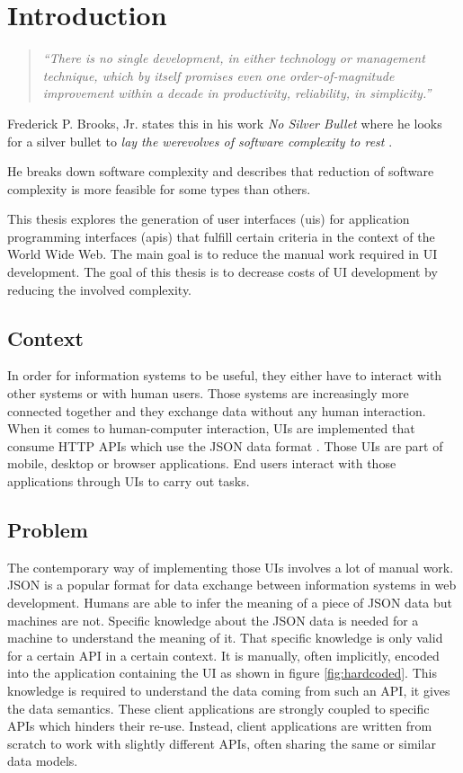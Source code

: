 \section{Introduction}\label{introduction}

\begin{quotation}
\textit{``There is no single development, in either technology or management technique, which by itself promises even one order-of-magnitude improvement within a decade in productivity, reliability, in simplicity.''} \citep[p.~1]{nosilverbullet}
\end{quotation}

Frederick P. Brooks, Jr. states this in his work \textit{No Silver Bullet} where he looks for a silver bullet to \textit{lay the werevolves of software complexity to rest} \citep[p.~1]{nosilverbullet}.

He breaks down software complexity and describes that reduction of software complexity is more feasible for some types than others.

This thesis explores the generation of user interfaces (\gls{ui}s) for application programming interfaces (\gls{api}s) that fulfill certain criteria in the context of the World Wide Web. The main goal is to reduce the manual work required in UI development. The goal of this thesis is to decrease costs of UI development by reducing the involved complexity.

\subsection{Context}\label{context}
In order for information systems to be useful, they either have to interact with other systems or with human users. Those systems are increasingly more connected together and they exchange data without any human interaction. When it comes to human-computer interaction, UIs are implemented that consume HTTP APIs which use the JSON data format \citep{jsonformat}. Those UIs are part of mobile, desktop or browser applications. End users interact with those applications through UIs to carry out tasks.

\subsection{Problem}\label{problem}
The contemporary way of implementing those UIs involves a lot of manual work. JSON is a popular format for data exchange between information systems in web development. Humans are able to infer the meaning of a piece of JSON data but machines are not. Specific knowledge about the JSON data is needed for a machine to understand the meaning of it. That specific knowledge is only valid for a certain API in a certain context. It is manually, often implicitly, encoded into the application containing the UI as shown in figure \ref{fig:hardcoded}. This knowledge is required to understand the data coming from such an API, it gives the data semantics. These client applications are strongly coupled to specific APIs which hinders their re-use. Instead, client applications are written from scratch to work with slightly different APIs, often sharing the same or similar data models.

